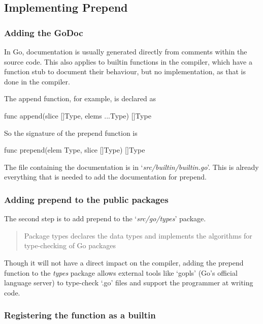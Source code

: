 \subsection{Implementing Prepend}

\subsubsection{Adding the GoDoc}
In Go, documentation is usually generated directly from comments within the source code\cite{godoc}. This also applies to
builtin functions in the compiler, which have a function stub to document their behaviour\cite{godoc-builtin},
but no implementation, as that is done in the compiler\cite{builtin-impl}.

The append function, for example, is declared as
\begin{gocode}
func append(slice []Type, elems ...Type) []Type
\end{gocode}

So the signature of the prepend function is
\begin{gocode}
func prepend(elem Type, slice []Type) []Type
\end{gocode}

The file containing the documentation is in `\textit{src/builtin/builtin.go}'.
This is already everything that is needed to add the documentation for prepend.

\subsubsection{Adding prepend to the public packages}

The second step is to add prepend to the `\textit{src/go/types}' package.
\begin{quote}
    Package types declares the data types and implements the algorithms for
    type-checking of Go packages
\end{quote}\cite{godoc-types}

Though it will not have a direct impact on the compiler, adding the prepend function
to the \textit{types} package allows external tools like `gopls' (Go's official language server)\cite{gopls} to type-check `.go' files and support the programmer
at writing code.

\subsubsection{Registering the function as a builtin}

